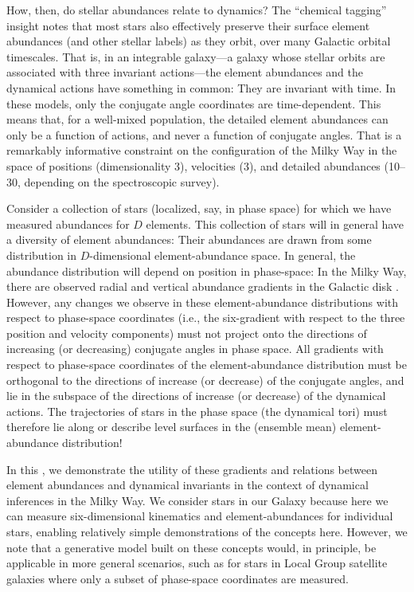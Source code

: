 \documentclass[modern]{aastex63}
\begin{document}
How, then, do stellar abundances relate to dynamics?
The ``chemical tagging'' insight \citep{Freeman:2002} notes that most stars also
effectively preserve their surface element abundances (and other stellar labels)
as they orbit, over many Galactic orbital timescales.
That is, in an integrable galaxy---a galaxy whose stellar orbits are associated
with three invariant actions---the element abundances and the dynamical actions
have something in common: They are invariant with time.
In these models, only the conjugate angle coordinates are time-dependent.
This means that, for a well-mixed population, the detailed element abundances
can only be a function of actions, and never a function of conjugate angles.
That is a remarkably informative constraint on the configuration of the Milky
Way in the space of positions (dimensionality 3), velocities (3), and
detailed abundances (10--30, depending on the spectroscopic survey).

Consider a collection of stars (localized, say, in phase space) for which we
have measured abundances for $D$ elements.
This collection of stars will in general have a diversity of element abundances:
Their abundances are drawn from some distribution in $D$-dimensional
element-abundance space.
In general, the abundance distribution will depend on position in phase-space:
In the Milky Way, there are observed radial and vertical abundance gradients in
the Galactic disk \citep[e.g.,][]{Hayden:2015, Queiroz:2020}.
However, any changes we observe in these element-abundance distributions with
respect to phase-space coordinates (i.e., the six-gradient with respect to the
three position and velocity components) must not project onto the directions of
increasing (or decreasing) conjugate angles in phase space.
All gradients with respect to phase-space coordinates of the element-abundance
distribution must be orthogonal to the directions of increase (or decrease) of
the conjugate angles, and lie in the subspace of the directions of increase (or
decrease) of the dynamical actions.
The trajectories of stars in the phase space (the dynamical tori) must therefore
lie along or describe level surfaces in the (ensemble mean) element-abundance
distribution!

In this \documentname, we demonstrate the utility of these gradients and
relations between element abundances and dynamical invariants in the context of
dynamical inferences in the Milky Way.
We consider stars in our Galaxy because here we can measure six-dimensional
kinematics and element-abundances for individual stars, enabling relatively
simple demonstrations of the concepts here.
However, we note that a generative model built on these concepts would, in
principle, be applicable in more general scenarios, such as for stars in Local
Group satellite galaxies where only a subset of phase-space coordinates are
measured.
\end{document}
